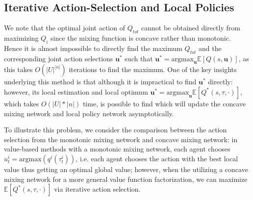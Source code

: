 {\subsection{Iterative Action-Selection and Local Policies} We note that the optimal joint action of $Q_{tot}$ cannot be obtained directly from maximizing $Q_i$ since the mixing function is concave rather than monotonic. Hence it is almost impossible to directly find the maximum $Q_{tot}$ and the corresponding joint action selections $\textbf{u}^*$ such that $\textbf{u}^{*} = \text{argmax}_{\textbf{u}} \mathbb{E}[Q(s, \textbf{u})]$, as this takes $O(|U|^{|n|})$ iterations to find the maximum. One of the key insights underlying this method is that although it is impractical to find  ${\textbf{u}^*}$ directly: however, its local estimation and local optimum $\textbf{u}^* = \text{argmax}_\textbf{u}\mathbb{E}[Q^*(s, \tau, \cdot)]$, which takes $O(|U|*{|n|})$ time, is possible to find which will update the concave mixing network and local policy network asymptotically. 




To illustrate this problem, we consider the comparison between the action selection from the monotonic mixing network and concave mixing network: in value-based methods with a monotonic mixing network, each agent chooses $u^i_t = \text{argmax}(q^i(\tau^i_t))$, i.e. each agent chooses the action with the best local value thus getting an optimal global value; however, when the utilizing a concave mixing network for a more general value function factorization, we can maximize $\mathbb{E}[Q^*(s, \tau, \cdot)]$ via iterative action selection.


}
